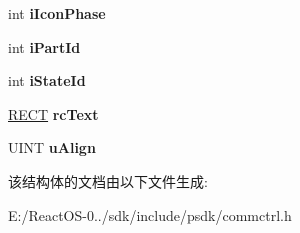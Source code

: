 \begin{DoxyCompactItemize}
\mbox{\label{structtag_n_m_l_v_c_u_s_t_o_m_d_r_a_w_a160db3512b2eebd0326b46f5fd25b5c1}} 
int {\bfseries i\+Icon\+Phase}
\item 
\mbox{\label{structtag_n_m_l_v_c_u_s_t_o_m_d_r_a_w_a4ec8a9b9e04c89f689496629fd74c65c}} 
int {\bfseries i\+Part\+Id}
\item 
\mbox{\label{structtag_n_m_l_v_c_u_s_t_o_m_d_r_a_w_a0e0c9c537326b76ebef6073d4e04e1f6}} 
int {\bfseries i\+State\+Id}
\item 
\mbox{\label{structtag_n_m_l_v_c_u_s_t_o_m_d_r_a_w_a213c7c4c889db040eee2614578bcfdb8}} 
\hyperlink{structtag_r_e_c_t}{R\+E\+CT} {\bfseries rc\+Text}
\item 
\mbox{\label{structtag_n_m_l_v_c_u_s_t_o_m_d_r_a_w_a2d6d050c51570e795a6ddd71435077b2}} 
U\+I\+NT {\bfseries u\+Align}
\end{DoxyCompactItemize}


该结构体的文档由以下文件生成\+:\begin{DoxyCompactItemize}
\item 
E\+:/\+React\+O\+S-\/0../sdk/include/psdk/commctrl.\+h\end{DoxyCompactItemize}
